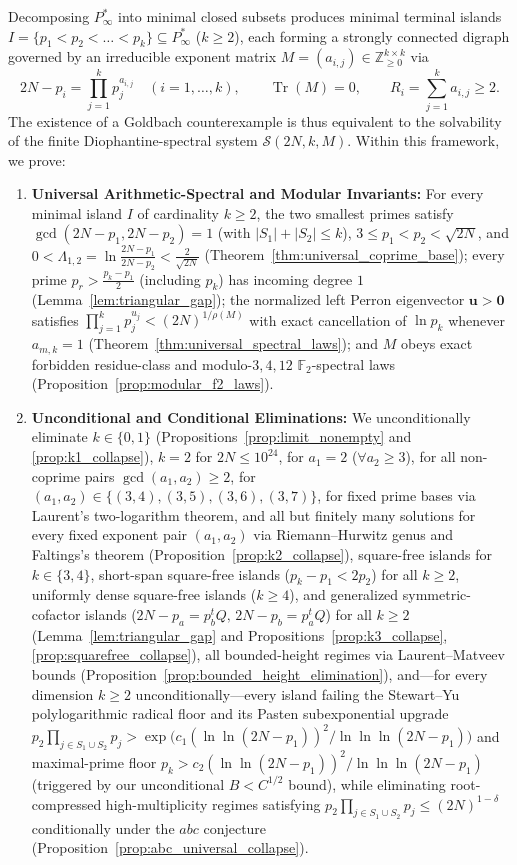 \documentclass[11pt,a4paper]{article}
\theoremstyle{definition}
\begin{document}
Decomposing $P^*_\infty$ into minimal closed subsets produces minimal terminal islands $I = \{p_1 < p_2 < \dots < p_k\} \subseteq P^*_\infty$ ($k \ge 2$), each forming a strongly connected digraph governed by an irreducible exponent matrix $M = (a_{i,j}) \in \mathbb{Z}_{\ge 0}^{k \times k}$ via
\[
2N - p_i = \prod_{j=1}^k p_j^{a_{i,j}} \quad (i = 1, \dots, k), \qquad \operatorname{Tr}(M) = 0, \qquad R_i = \sum_{j=1}^k a_{i,j} \ge 2.
\]
The existence of a Goldbach counterexample is thus equivalent to the solvability of the finite Diophantine-spectral system $\mathcal{S}(2N, k, M)$. Within this framework, we prove:
\begin{enumerate}
    \item \textbf{Universal Arithmetic-Spectral and Modular Invariants:} For every minimal island $I$ of cardinality $k \ge 2$, the two smallest primes satisfy $\gcd(2N - p_1, 2N - p_2) = 1$ (with $|S_1| + |S_2| \le k$), $3 \le p_1 < p_2 < \sqrt{2N}$, and $0 < \Lambda_{1,2} = \ln\frac{2N - p_1}{2N - p_2} < \frac{2}{\sqrt{2N}}$ (Theorem~\ref{thm:universal_coprime_base}); every prime $p_r > \frac{p_k - p_1}{2}$ (including $p_k$) has incoming degree $1$ (Lemma~\ref{lem:triangular_gap}); the normalized left Perron eigenvector $\mathbf{u} > \mathbf{0}$ satisfies $\prod_{j=1}^k p_j^{u_j} < (2N)^{1/\rho(M)}$ with exact cancellation of $\ln p_k$ whenever $a_{m,k} = 1$ (Theorem~\ref{thm:universal_spectral_laws}); and $M$ obeys exact forbidden residue-class and modulo-$3, 4, 12$ $\mathbb{F}_2$-spectral laws (Proposition~\ref{prop:modular_f2_laws}).
    \item \textbf{Unconditional and Conditional Eliminations:} We unconditionally eliminate $k \in \{0, 1\}$ (Propositions~\ref{prop:limit_nonempty} and \ref{prop:k1_collapse}), $k = 2$ for $2N \le 10^{24}$, for $a_1 = 2$ ($\forall a_2 \ge 3$), for all non-coprime pairs $\gcd(a_1, a_2) \ge 2$, for $(a_1, a_2) \in \{(3,4), (3,5), (3,6), (3,7)\}$, for fixed prime bases via Laurent's two-logarithm theorem, and all but finitely many solutions for every fixed exponent pair $(a_1, a_2)$ via Riemann--Hurwitz genus and Faltings's theorem (Proposition~\ref{prop:k2_collapse}), square-free islands for $k \in \{3, 4\}$, short-span square-free islands ($p_k - p_1 < 2p_2$) for all $k \ge 2$, uniformly dense square-free islands ($k \ge 4$), and generalized symmetric-cofactor islands ($2N - p_a = p_b^t Q, \, 2N - p_b = p_a^t Q$) for all $k \ge 2$ (Lemma~\ref{lem:triangular_gap} and Propositions~\ref{prop:k3_collapse}, \ref{prop:squarefree_collapse}), all bounded-height regimes via Laurent--Matveev bounds (Proposition~\ref{prop:bounded_height_elimination}), and---for every dimension $k \ge 2$ unconditionally---every island failing the Stewart--Yu polylogarithmic radical floor and its Pasten subexponential upgrade $p_2 \prod_{j \in S_1 \cup S_2} p_j > \exp\bigl(c_1 (\ln\ln(2N - p_1))^2 / \ln\ln\ln(2N - p_1)\bigr)$ and maximal-prime floor $p_k > c_2 (\ln\ln(2N - p_1))^2 / \ln\ln\ln(2N - p_1)$ (triggered by our unconditional $B < C^{1/2}$ bound), while eliminating root-compressed high-multiplicity regimes satisfying $p_2 \prod_{j \in S_1 \cup S_2} p_j \le (2N)^{1-\delta}$ conditionally under the $abc$ conjecture (Proposition~\ref{prop:abc_universal_collapse}).

\end{enumerate}
\end{document}
